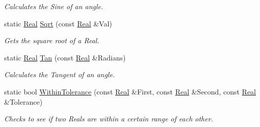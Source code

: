 \begin{DoxyCompactItemize}
\begin{DoxyCompactList}\small\item\em Calculates the Sine of an angle. \item\end{DoxyCompactList}\item 
static \hyperlink{namespaceMezzanine_a726731b1a7df72bf3583e4a97282c6f6}{Real} \hyperlink{classMezzanine_1_1MathTool_af230371a8d6f59b4ee78670afd3928fa}{Sqrt} (const \hyperlink{namespaceMezzanine_a726731b1a7df72bf3583e4a97282c6f6}{Real} \&Val)
\begin{DoxyCompactList}\small\item\em Gets the square root of a Real. \item\end{DoxyCompactList}\item 
static \hyperlink{namespaceMezzanine_a726731b1a7df72bf3583e4a97282c6f6}{Real} \hyperlink{classMezzanine_1_1MathTool_a4fd17164ea990aff0203c63946bb1d48}{Tan} (const \hyperlink{namespaceMezzanine_a726731b1a7df72bf3583e4a97282c6f6}{Real} \&Radians)
\begin{DoxyCompactList}\small\item\em Calculates the Tangent of an angle. \item\end{DoxyCompactList}\item 
static bool \hyperlink{classMezzanine_1_1MathTool_a6b7462a4da72393082a222c1e69adc8b}{WithinTolerance} (const \hyperlink{namespaceMezzanine_a726731b1a7df72bf3583e4a97282c6f6}{Real} \&First, const \hyperlink{namespaceMezzanine_a726731b1a7df72bf3583e4a97282c6f6}{Real} \&Second, const \hyperlink{namespaceMezzanine_a726731b1a7df72bf3583e4a97282c6f6}{Real} \&Tolerance)
\begin{DoxyCompactList}\small\item\em Checks to see if two Reals are within a certain range of each other. \item\end{DoxyCompactList}\end{DoxyCompactItemize}
